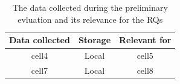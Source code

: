 \begin{table}[h]
    \centering
    \begin{tabular}{ |c|c|c| }
        \hline
        Data collected & Storage & Relevant for \\
        \hline
        cell4          & Local   & cell5        \\
        cell7          & Local   & cell8        \\
        \hline
    \end{tabular}
    \caption{The data collected during the preliminary evluation and its relevance for the RQs}
    \label{table:data_collection}
\end{table}